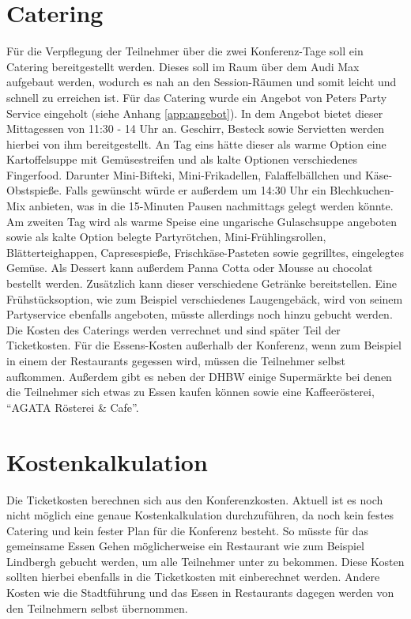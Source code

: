 \section{Catering}
Für die Verpflegung der Teilnehmer über die zwei Konferenz-Tage soll ein Catering bereitgestellt werden. Dieses soll im Raum über dem Audi Max aufgebaut werden, wodurch es nah an den Session-Räumen und somit leicht und schnell zu erreichen ist. Für das Catering wurde ein Angebot von Peters Party Service eingeholt (siehe Anhang \vref{app:angebot}). In dem Angebot bietet dieser Mittagessen von 11:30 - 14 Uhr an. Geschirr, Besteck sowie Servietten werden hierbei von ihm bereitgestellt. An Tag eins hätte dieser als warme Option eine Kartoffelsuppe mit Gemüsestreifen und als kalte Optionen verschiedenes Fingerfood. Darunter Mini-Bifteki, Mini-Frikadellen, Falaffelbällchen und Käse-Obstspieße. Falls gewünscht würde er außerdem um 14:30 Uhr ein Blechkuchen-Mix anbieten, was in die 15-Minuten Pausen nachmittags gelegt werden könnte. Am zweiten Tag wird als warme Speise eine ungarische Gulaschsuppe angeboten sowie als kalte Option belegte Partyrötchen, Mini-Frühlingsrollen, Blätterteighappen, Capresespieße, Frischkäse-Pasteten sowie gegrilltes, eingelegtes Gemüse. Als Dessert kann außerdem Panna Cotta oder Mousse au chocolat bestellt werden. Zusätzlich kann dieser verschiedene Getränke bereitstellen. Eine Frühstücksoption, wie zum Beispiel verschiedenes Laugengebäck, wird von seinem Partyservice ebenfalls angeboten, müsste allerdings noch hinzu gebucht werden. Die Kosten des Caterings werden verrechnet und sind später Teil der Ticketkosten. Für die Essens-Kosten außerhalb der Konferenz, wenn zum Beispiel in einem der Restaurants gegessen wird, müssen die Teilnehmer selbst aufkommen.
Außerdem gibt es neben der DHBW einige Supermärkte bei denen die Teilnehmer sich etwas zu Essen kaufen können sowie eine Kaffeerösterei, \enquote{AGATA Rösterei \& Cafe}. 

\section{Kostenkalkulation}
Die Ticketkosten berechnen sich aus den Konferenzkosten. Aktuell ist es noch nicht möglich eine genaue Kostenkalkulation durchzuführen, da noch kein festes Catering und kein fester Plan für die Konferenz besteht. So müsste für das gemeinsame Essen Gehen möglicherweise ein Restaurant wie zum Beispiel Lindbergh gebucht werden, um alle Teilnehmer unter zu bekommen. Diese Kosten sollten hierbei ebenfalls in die Ticketkosten mit einberechnet werden. Andere Kosten wie die Stadtführung und das Essen in Restaurants dagegen werden von den Teilnehmern selbst übernommen. 

